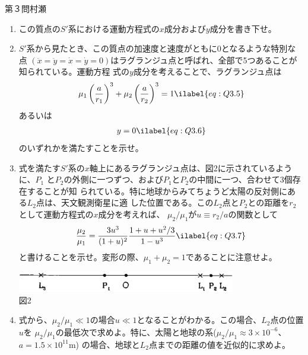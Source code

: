 \begin{question}{第３問}{村瀬}
\begin{enumerate}
\begin{align}
  \end{align}
  となることを示せ。ただし、
  \begin{align}
    r_1\equiv\sqrt{(x+\mu_2a)^2+y^2},\quad
    r_2\equiv\sqrt{(x-\mu_1a)^2+y^2} \ilabel{eq:Q3.4}
  \end{align}
  である。
\item
  この質点の$S'$系における運動方程式の$x$成分および$y$成分を書き下せ。
\item
  $S'$系から見たとき、この質点の加速度と速度がともに0となるような特別な点
  $(\ddot x=\ddot y= \dot x = \dot y=0)$はラグランジュ点と呼ばれ、全部で5つあることが知られている。運動方程
  式の$y$成分を考えることで、ラグランジュ点は
  \begin{align}
    \mu_1\left(\frac{a}{r_1}\right)^3
    + \mu_2\left(\frac{a}{r_2}\right)^3 = 1 \ilabel{eq:Q3.5}
  \end{align}
  あるいは
  \begin{align}
    y=0 \ilabel{eq:Q3.6}
  \end{align}
  のいずれかを満たすことを示せ。

\item
  式を満たす$S'$系の$x$軸上にあるラグランジュ点は、図2に示されているように、$P_1$
  と$P_2$の外側に一つずつ、および$P_1$と$P_2$の中間に一つ、合わせて3個存在することが知
  られている。特に地球からみてちょうど太陽の反対側にある$L_2$点は、天文観測衛星に適
  した位置である。この$L_2$点と$P_2$との距離を$r_2$として運動方程式の$x$成分を考えれば、
  $\mu_2/\mu_1$が$u\equiv r_2/a$の関数として
  \begin{align}
    \frac{\mu_2}{\mu_1} = \frac{3u^3}{(1+u)^2}\frac{1+u+u^2/3}{1-u^3} \ilabel{eq:Q3.7}
  \end{align}
  と書けることを示せ。変形の際、$\mu_1+\mu_2=1$であることに注意せよ。
  \begin{center}
    \includegraphics[width=0.75\textwidth]{2006physQ3_2r.eps}\\図2
  \end{center}
\item
  式から、$\mu_2/\mu_1\ll1$の場合$u\ll1$となることがわかる。この場合、$L_2$点の位置$u$を
  $\mu_2/\mu_1$の最低次で求めよ。特に、太陽と地球の系($\mu_2/\mu_1\approx3\times10^{-6}$、$a=1.5\times10^{11}$m)
  の場合、地球と$L_2$点までの距離の値を近似的に求めよ。
\end{enumerate}
\end{question}

